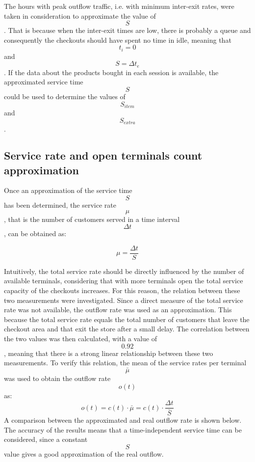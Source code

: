 The hours with peak outflow traffic, i.e. with minimum inter-exit rates, were taken in consideration to approximate the value of $$ S $$. That is because when the inter-exit times are low, there is probably a queue and consequently the checkouts should have spent no time in idle, meaning that $$ t_i = 0 $$ and $$ S = \Delta t_e $$. If the data about the products bought in each session is available, the approximated service time $$ S $$ could be used to determine the values of $$ S_{item} $$ and $$ S_{extra} $$.

\subsection{Service rate and open terminals count approximation}
\label{subsec:service_rate_and_open_terminals_count_approximation}
Once an approximation of the service time $$ S $$ has been determined, the service rate $$ \mu $$, that is the number of customers served in a time interval $$ \Delta t $$, can be obtained as:

$$ \mu = \frac{\Delta t}{S}$$

Intuitively, the total service rate should be directly influenced by the number of available terminals, considering that with more terminals open the total service capacity of the checkouts increases. For this reason, the relation between these two measurements were investigated. Since a direct measure of the total service rate was not available, the outflow rate was used as an approximation. This because the total service rate equals the total number of customers that leave the checkout area and that exit the store after a small delay. The correlation between the two values was then calculated, with a value of $$ 0.92 $$, meaning that there is a strong linear relationship between these two measurements.
To verify this relation, the mean of the service rates per terminal $$ \bar{\mu} $$ was used to obtain the outflow rate $$ o(t) $$ as:
$$ o(t) = c(t) \cdot \bar{\mu} = c(t) \cdot \frac{\Delta t}{\bar{S}} $$
A comparison between the approximated and real outflow rate is shown below. The accuracy of the results means that a time-independent service time can be considered, since a constant $$ S $$ value gives a good approximation of the real outflow.


\clearpage